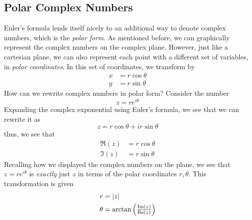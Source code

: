 \subsection{Polar Complex Numbers}
Euler's formula lends itself nicely to an additional way to denote complex numbers, which is the \emph{polar form}. As mentioned before, we can graphically represent the complex numbers on the complex plane. However, just like a cartesian plane, we can also represent each point with a different set of variables, in \emph{polar coordinates}. In this set of coordinates, we transform by
\begin{align*}
	x&=r\cos\theta\\
	y&=r\sin\theta
\end{align*}
How can we rewrite complex numbers in polar form? Consider the number
\[z = re^{i\theta}\]
Expanding the complex exponential using Euler's formula, we see that we can rewrite it as
\[z = r\cos\theta + ir\sin\theta\]
thus, we see that
\begin{subequations}
	\begin{align}
		\Re(z)&=r\cos\theta\\
		\Im(z)&=r\sin\theta
	\end{align}
\end{subequations}
Recalling how we displayed the complex numbers on the plane, we see that \(z=re^{i\theta}\) is \emph{exactly} just \(z\) in terms of the polar coordinates \(r,\theta\). This transformation is given
\begin{subequations}
	\begin{align}
		r &= \left|z\right|\\
		\theta &= \arctan\left(\tfrac{\operatorname{Im}(z)}{\operatorname{Re}(z)}\right)
	\end{align}
\end{subequations}
